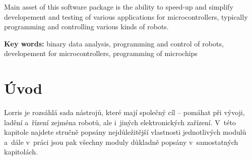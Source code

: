 \documentclass[12pt, a4paper, oneside]{article}
\newcommand{\D}{\medskip \noindent} %
\newcommand{\B}{\textbf} %
\begin{document}
Main asset of this software package is the ability to speed-up and simplify developement and testing of various applications for microcontrollers, typically programming and controlling various kinds of robots.

\D \B{Key words:} binary data analysis, programming and control of robots, developement for microcontrollers, programming of microchips

\addtolength{\textheight}{30mm} %

\newpage
\pagestyle{plain}

\setlength{\voffset}{-20mm} %
\setcounter{page}{1}  %

\tableofcontents  %

\addtolength{\textheight}{-30mm} %
\newpage
\setlength{\voffset}{0mm} %
\pagestyle{plain}

\section*{Úvod}
\label{uvod}
Lorris je rozsáhlá sada nástrojů, které mají společný cíl -- pomáhat při vývoji, ladění a~řízení zejména robotů, ale i~jiných elektronických zařízení. V~této kapitole najdete stručně popsány nejdůležitější vlastnosti jednotlivých modulů a~dále v~práci jsou pak všechny moduly důkladně popsány v~samostatných kapitolách.
\end{document}
